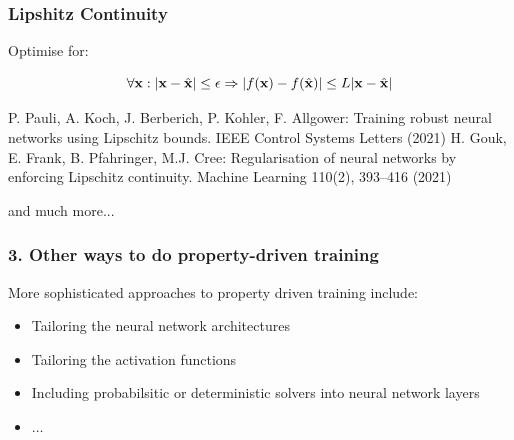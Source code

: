 \documentclass[aspectratio=169]{beamer}
\newcommand{\distance}[2]{|#1 - #2|}
\newcommand{\xs}{\x} 			%
\begin{document}
    \begin{frame}
      \frametitle{ Lipshitz Continuity}

      Optimise for: 
      
  \begin{equation*}
    \label{eq:lipschitz-robustness}
    \forall \xs: \distance{\xs}{\xt} \leq \epsilon \Rightarrow \distance{f(\xs)}{f(\xt)} \leq L \distance{\xs}{\xt}
  \end{equation*}

   {\scriptsize
   \begin{thebibliography}{99}
        \beamertemplatearticlebibitems
P. Pauli, A. Koch, J. Berberich, P. Kohler, F. Allgower: Training robust neural networks
using Lipschitz bounds. IEEE Control Systems Letters (2021)
 H. Gouk, E. Frank, B. Pfahringer, M.J. Cree: Regularisation of neural networks by enforcing Lipschitz continuity. Machine Learning 110(2), 393–416 (2021)
\end{thebibliography}}


and much more...

    \end{frame}


 \begin{frame}
      \frametitle{3. Other ways to do property-driven training}

\begin{block}{More sophisticated approaches to property driven training include:}
\begin{itemize}
\item Tailoring the neural network architectures

\item Tailoring the activation functions

\item Including probabilsitic or deterministic solvers into neural network layers

\item $\ldots$
\end{itemize}
\end{block}

  {\scriptsize
 \begin{thebibliography}{99}
   \beamertemplatearticlebibitems
\end{thebibliography}}
 


\end{frame}
\end{document}
